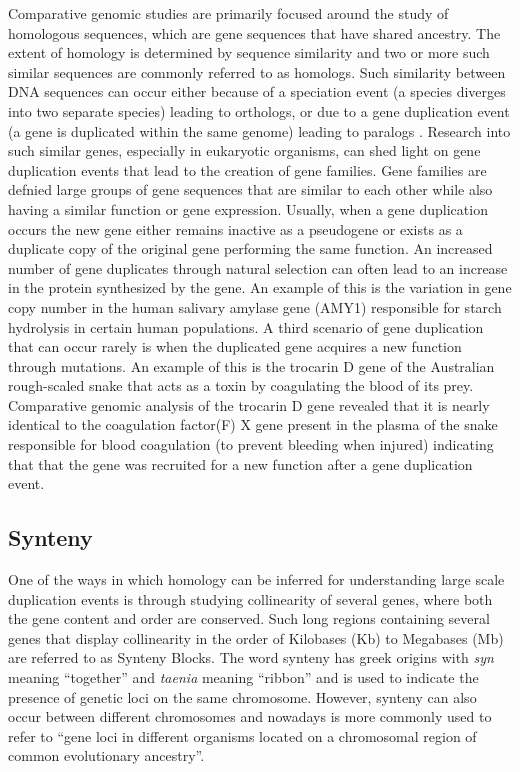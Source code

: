 Comparative genomic studies are primarily focused around the study of homologous sequences, which are gene sequences that have shared ancestry. The extent of homology is determined by sequence similarity and two or more such similar sequences are commonly referred to as homologs. Such similarity between DNA sequences can occur either because of a speciation event (a species diverges into two separate species) leading to orthologs, or due to a gene duplication event (a gene is duplicated within the same genome) leading to paralogs \cite{jensen2001orthologs}. Research into such similar genes, especially in eukaryotic organisms, can shed light on gene duplication events that lead to the creation of gene families\cite{rubin2000comparative}. Gene families are defnied large groups of gene sequences that are similar to each other while also having a similar function or gene expression. Usually, when a gene duplication occurs the new gene either remains inactive as a pseudogene or exists as a duplicate copy of the original gene performing the same function. An increased number of gene duplicates through natural selection can often lead to an increase in the protein synthesized by the gene. An example of this is the variation in gene copy number in the human salivary amylase gene (AMY1) responsible for starch hydrolysis in certain human populations\cite{perry2007diet}. A third scenario of gene duplication that can occur rarely is when the duplicated gene acquires a new function through mutations. An example of this is the trocarin D gene of the Australian rough-scaled snake that acts as a toxin by coagulating the blood of its prey. Comparative genomic analysis of the trocarin D gene revealed that it is nearly identical to the coagulation factor(F) X gene present in the plasma of the snake responsible for blood coagulation (to prevent bleeding when injured) indicating that that the gene was recruited for a new function after a gene duplication event\cite{reza2007structure}.

\subsection{Synteny}
One of the ways in which homology can be inferred for understanding large scale duplication events is through studying collinearity of several genes, where both the gene content and order are conserved\cite{proost2011adhore}. Such long regions containing several genes that display collinearity in the order of Kilobases (Kb) to Megabases (Mb) are referred to as Synteny Blocks\cite{zeng2008orthocluster}. The word synteny has greek origins with \textit{syn} meaning ``together'' and \textit{taenia} meaning ``ribbon'' and is used to indicate the presence of genetic loci on the same chromosome\cite{renwick1971mapping}. However, synteny can also occur between different chromosomes and nowadays is more commonly used to refer to ``gene loci in different organisms located on a chromosomal region of common evolutionary ancestry''\cite{passarge1999incorrect}.

